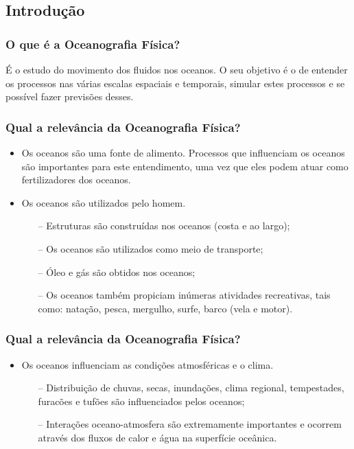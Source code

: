 \subsection{Introdução}
\begin{frame}
    \frametitle{O que é a Oceanografia Física?}
    \begin{block}{}
        É o estudo do movimento dos fluidos nos oceanos.  O seu objetivo é o de
        entender os processos nas várias escalas espaciais e temporais, simular
        estes processos e se possível fazer previsões desses.
    \end{block}
\end{frame}

\begin{frame}
    \frametitle{Qual a relevância da Oceanografia Física?}
    \begin{itemize}[<+-| alert@+>]
        \item Os oceanos são uma fonte de alimento.  Processos que influenciam
              os oceanos são importantes para este entendimento, uma vez que
              eles podem atuar como fertilizadores dos oceanos.
        \item Os oceanos são utilizados pelo homem.
            \begin{enumerate}[<+-| alert@+>]
                \item[--] Estruturas são construídas nos oceanos (costa e ao largo);
                \item[--] Os oceanos são utilizados como meio de transporte;
                \item[--] Óleo e gás são obtidos nos oceanos;
                \item[--] Os oceanos também propiciam inúmeras atividades recreativas,
                          tais como: natação, pesca, mergulho, surfe, barco (vela e motor).

            \end{enumerate}
    \end{itemize}
\end{frame}

\begin{frame}
    \frametitle{Qual a relevância da Oceanografia Física?}
    \begin{itemize}[<+-| alert@+>]
        \item Os oceanos influenciam as condições atmosféricas e o clima.
            \begin{enumerate}[<+-| alert@+>]
                \item[--] Distribuição de chuvas, secas, inundações, clima regional,
                          tempestades, furacões e tufões são influenciados pelos oceanos;
                \item[--] Interações oceano-atmosfera são extremamente importantes e
                          ocorrem através dos fluxos de calor e água na superfície oceânica.
            \end{enumerate}
    \end{itemize}
\end{frame}

